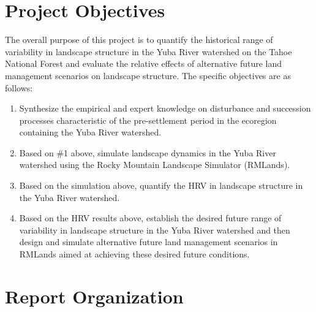 \section{Project Objectives}
The overall purpose of this project is to quantify the historical range of variability in landscape structure in the Yuba River watershed on the Tahoe National Forest and evaluate the relative effects of  alternative future land management scenarios on landscape structure. The specific objectives are as follows:
\begin{enumerate}
	\item Synthesize the empirical and expert knowledge on disturbance and succession processes characteristic of the pre-settlement period in the ecoregion containing the Yuba River watershed.
	\item Based on \#1 above, simulate landscape dynamics in the Yuba River watershed using the Rocky Mountain Landscape Simulator (RMLands).
	\item Based on the simulation above, quantify the HRV in landscape structure in the Yuba River watershed.
	\item Based on the HRV results above, establish the desired future range of variability in landscape structure in the Yuba River watershed and then design and simulate alternative future land management scenarios in RMLands aimed at achieving these desired future conditions.
\end{enumerate}


\section{Report Organization}
